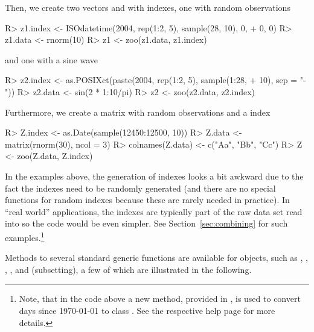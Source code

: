 \documentclass{Z}
\begin{document}
Then, we create two vectors  and  with  
indexes, one with random observations
\begin{Schunk}
\begin{Sinput}
R> z1.index <- ISOdatetime(2004, rep(1:2, 5), sample(28, 10), 0, 
+     0, 0)
R> z1.data <- rnorm(10)
R> z1 <- zoo(z1.data, z1.index)
\end{Sinput}
\end{Schunk}
and one with a sine wave
\begin{Schunk}
\begin{Sinput}
R> z2.index <- as.POSIXct(paste(2004, rep(1:2, 5), sample(1:28, 
+     10), sep = "-"))
R> z2.data <- sin(2 * 1:10/pi)
R> z2 <- zoo(z2.data, z2.index)
\end{Sinput}
\end{Schunk}
Furthermore, we create a matrix  with random observations and a 
index
\begin{Schunk}
\begin{Sinput}
R> Z.index <- as.Date(sample(12450:12500, 10))
R> Z.data <- matrix(rnorm(30), ncol = 3)
R> colnames(Z.data) <- c("Aa", "Bb", "Cc")
R> Z <- zoo(Z.data, Z.index)
\end{Sinput}
\end{Schunk}
In the examples above, the generation of indexes looks a bit awkward
due to the fact the indexes need to be randomly generated (and there 
are no special functions for random indexes because these are rarely 
needed in practice). In ``real world'' applications, the indexes
are typically part of the raw data set read into  so the
code would be even simpler. See Section~\ref{sec:combining}
for such examples.\footnote{Note, that in the code above a new 
method, provided in , is used to convert days 
since 1970-01-01 to class . See the respective help page 
for more details.}

Methods to several standard generic functions are available for
 objects, such as , , , ,
 and \code{[} (subsetting), a few of which are illustrated in
the following.
\end{document}
